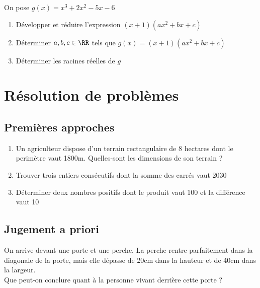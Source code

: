 \documentclass[oneside,12pt]{book}          %
\begin{document}
 On pose $g(x) = x^{3}+2x^{2}-5x-6 $
\begin{enumerate}
    \item Développer et réduire l'expression $(x+1)(ax^{2}+bx+c) $ 
    \item Déterminer $a,b,c\in\RR$ tels que $g(x) = (x+1)(ax^{2}+bx+c) $ 
    \item Déterminer les racines réelles de $g$ 
\end{enumerate}



\section{Résolution de problèmes}

\subsection{Premières approches}
\begin{enumerate}

    \item Un agriculteur dispose d'un terrain rectangulaire de 8 hectares dont le perimètre vaut 1800m. Quelles-sont les dimensions de son terrain ?
    \item Trouver trois entiers consécutifs dont la somme des carrés vaut 2030
    \item Déterminer deux nombres positifs dont le produit vaut 100 et la différence vaut 10
\end{enumerate}



\subsection{Jugement a priori}

On arrive devant une porte et une perche. La perche rentre parfaitement dans la diagonale de la porte, mais elle dépasse de 20cm dans la hauteur et de 40cm dans la largeur.\\[5pt]
Que peut-on conclure quant à la personne vivant derrière cette porte ?
\end{document}
